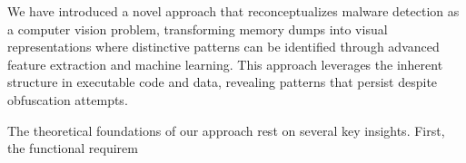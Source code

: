 We have introduced a novel approach that reconceptualizes malware detection as a computer vision problem, transforming memory dumps into visual representations where distinctive patterns can be identified through advanced feature extraction and machine learning. This approach leverages the inherent structure in executable code and data, revealing patterns that persist despite obfuscation attempts.

The theoretical foundations of our approach rest on several key insights. First, the functional requirem
